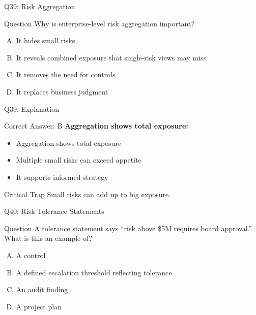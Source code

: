 \documentclass{beamer}
\begin{document}
	\begin{frame}{Q39: Risk Aggregation}
		\begin{block}{Question}
			Why is enterprise-level risk aggregation important?
		\end{block}
		\begin{enumerate}[(A)]
			\item It hides small risks
			\item It reveals combined exposure that single-risk views may miss
			\item It removes the need for controls
			\item It replaces business judgment
		\end{enumerate}
	\end{frame}
	
	\begin{frame}{Q39: Explanation}
		\begin{block}{Correct Answer: B}
			\textbf{Aggregation shows total exposure:}
			\begin{itemize}
				\item Aggregation shows total exposure
				\item Multiple small risks can exceed appetite
				\item It supports informed strategy
			\end{itemize}
		\end{block}
		\begin{alertblock}{Critical Trap}
			Small risks can add up to big exposure.
		\end{alertblock}
	\end{frame}
	
	\begin{frame}{Q40: Risk Tolerance Statements}
		\begin{block}{Question}
			A tolerance statement says ``risk above \$5M requires board approval.'' What is this an example of?
		\end{block}
		\begin{enumerate}[(A)]
			\item A control
			\item A defined escalation threshold reflecting tolerance
			\item An audit finding
			\item A project plan
		\end{enumerate}
	\end{frame}
	
\end{document}
